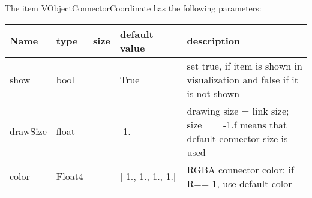 The item VObjectConnectorCoordinate has the following parameters:\vspace{-1cm}\\ 
\begin{center}
  \footnotesize
  \begin{longtable}{| p{4.5cm} | p{2.5cm} | p{0.5cm} | p{2.5cm} | p{6cm} |}
    \hline
    \bf Name & \bf type & \bf size & \bf default value & \bf description \\ \hline
    show &     bool &      &     True &     set true, if item is shown in visualization and false if it is not shown\\ \hline
    drawSize &     float &      &     -1. &     drawing size = link size; size == -1.f means that default connector size is used\\ \hline
    color &     Float4 &      &     [-1.,-1.,-1.,-1.] &     RGBA connector color; if R==-1, use default color\\ \hline
	  \end{longtable}
	\end{center}

